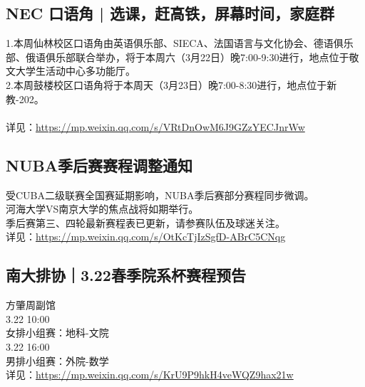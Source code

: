 \documentclass[letterpaper, 12pt]{article}
\begin{document}
\begin{multicols}{2}
\subsection{NEC 口语角 | 选课，赶高铁，屏幕时间，家庭群}
1.本周仙林校区口语角由英语俱乐部、SIECA、法国语言与文化协会、德语俱乐部、俄语俱乐部联合举办，将于本周六（3月22日）晚7:00-9:30进行，地点位于敬文大学生活动中心多功能厅。
\\2.本周鼓楼校区口语角将于本周天（3月23日）晚7:00-8:30进行，地点位于新教-202。
\\
\\详见：\url{https://mp.weixin.qq.com/s/VRtDnOwM6J9GZzYECJnrWw}

\subsection{NUBA季后赛赛程调整通知}
受CUBA二级联赛全国赛延期影响，NUBA季后赛部分赛程同步微调。
\\河海大学VS南京大学的焦点战将如期举行。
\\季后赛第三、四轮最新赛程表已更新，请参赛队伍及球迷关注。
\\详见：\url{https://mp.weixin.qq.com/s/OtKcTjIzSgfD-ABrC5CNqg}

\subsection{南大排协｜3.22春季院系杯赛程预告}
方肇周副馆
\\3.22 10:00
\\女排小组赛：地科-文院
\\3.22 16:00
\\男排小组赛：外院-数学
\\详见：\url{https://mp.weixin.qq.com/s/KrU9P9hkH4veWQZ9hax21w}
\end{multicols}
\end{document}
